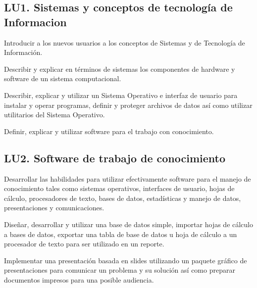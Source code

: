 \subsection{LU1. Sistemas y conceptos de tecnología de Informacion}\label{sec:BOK-LU1}\label{sec:LU1}
\begin{LearningUnit}
\begin{LUGoal}
\item Introducir a los nuevos usuarios a los conceptos de Sistemas y de Tecnología de Información.
\end{LUGoal}

\begin{LUObjective}
\item Describir y explicar en términos de sistemas los componentes de hardware y software de un sistema computacional.
\item Describir, explicar y utilizar un Sistema Operativo e interfaz de usuario para instalar y operar programas, definir y proteger archivos de datos así como utilizar utilitarios del Sistema Operativo.
\item Definir, explicar y utilizar software para el trabajo con conocimiento.
\end{LUObjective}
\end{LearningUnit}

\subsection{LU2. Software de trabajo de conocimiento}\label{sec:BOK-LU2}\label{sec:LU2}
\begin{LearningUnit}
\begin{LUGoal}
\item Desarrollar las habilidades para utilizar efectivamente software para el manejo de conocimiento tales como sistemas operativos, interfaces de usuario, hojas de cálculo, procesadores de texto, bases de datos, estadísticas y manejo de datos, presentaciones y comunicaciones.
\end{LUGoal}

\begin{LUObjective}
\item Diseñar, desarrollar y utilizar una base de datos simple, importar hojas de cálculo a bases de datos, exportar una tabla de base de datos u hoja de cálculo a un procesador de texto para ser utilizado en un reporte.
\item Implementar una presentación basada en slides utilizando un paquete gráfico de presentaciones para comunicar un problema y su solución así como preparar documentos impresos para una posible audiencia.
\end{LUObjective}
\end{LearningUnit}

